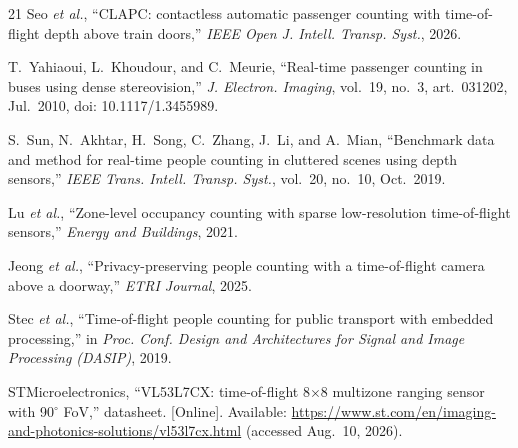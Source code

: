 \documentclass[conference]{IEEEtran}
\begin{document}
\begin{thebibliography}{21}
Seo \emph{et al.}, ``CLAPC: contactless automatic passenger counting with
time-of-flight depth above train doors,'' \emph{IEEE Open J. Intell. Transp.
Syst.}, 2026.

T.~Yahiaoui, L.~Khoudour, and C.~Meurie, ``Real-time passenger counting in
buses using dense stereovision,'' \emph{J. Electron. Imaging}, vol.~19,
no.~3, art.~031202, Jul.\ 2010, doi: 10.1117/1.3455989.

S.~Sun, N.~Akhtar, H.~Song, C.~Zhang, J.~Li, and A.~Mian, ``Benchmark data
and method for real-time people counting in cluttered scenes using depth
sensors,'' \emph{IEEE Trans. Intell. Transp. Syst.}, vol.~20, no.~10,
Oct.\ 2019.

Lu \emph{et al.}, ``Zone-level occupancy counting with sparse low-resolution
time-of-flight sensors,'' \emph{Energy and Buildings}, 2021.

Jeong \emph{et al.}, ``Privacy-preserving people counting with a
time-of-flight camera above a doorway,'' \emph{ETRI Journal}, 2025.

Stec \emph{et al.}, ``Time-of-flight people counting for public transport
with embedded processing,'' in \emph{Proc. Conf. Design and Architectures
for Signal and Image Processing (DASIP)}, 2019.

STMicroelectronics, ``VL53L7CX: time-of-flight 8$\times$8 multizone ranging
sensor with 90$^\circ$ FoV,'' datasheet. [Online]. Available:
\url{https://www.st.com/en/imaging-and-photonics-solutions/vl53l7cx.html}
(accessed Aug.\ 10, 2026).


\end{thebibliography}
\end{document}
